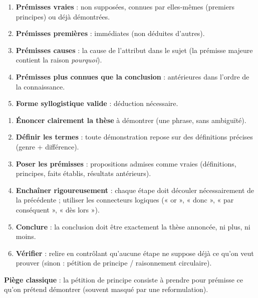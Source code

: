 \documentclass[11pt]{article}
\newcommand{\cle}[1]{{\popxbold\color{popdark}#1}}
\begin{document}
\begin{propriete}
\begin{enumerate}
\item \textbf{Prémisses vraies} : non supposées, connues par elles-mêmes (premiers principes) ou déjà démontrées.
\item \textbf{Prémisses premières} : immédiates (non déduites d'autres).
\item \textbf{Prémisses causes} : la cause de l'attribut dans le sujet (la prémisse majeure contient la raison \emph{pourquoi}).
\item \textbf{Prémisses plus connues que la conclusion} : antérieures dans l'ordre de la connaissance.
\item \textbf{Forme syllogistique valide} : déduction nécessaire.
\end{enumerate}
\end{propriete}

\begin{methode}
\begin{enumerate}
\item \textbf{Énoncer clairement la thèse} à démontrer (une phrase, sans ambiguïté).
\item \textbf{Définir les termes} : toute démonstration repose sur des définitions précises (genre + différence).
\item \textbf{Poser les prémisses} : propositions admises comme vraies (définitions, principes, faits établis, résultats antérieurs).
\item \textbf{Enchaîner rigoureusement} : chaque étape doit découler nécessairement de la précédente ; utiliser les connecteurs logiques (« or », « donc », « par conséquent », « dès lors »).
\item \textbf{Conclure} : la conclusion doit être exactement la thèse annoncée, ni plus, ni moins.
\item \textbf{Vérifier} : relire en contrôlant qu'aucune étape ne suppose déjà ce qu'on veut prouver (sinon : \cle{pétition de principe} / raisonnement circulaire).
\end{enumerate}
\textbf{Piège classique} : la pétition de principe consiste à prendre pour prémisse ce qu'on prétend démontrer (souvent masqué par une reformulation).
\end{methode}
\end{document}
